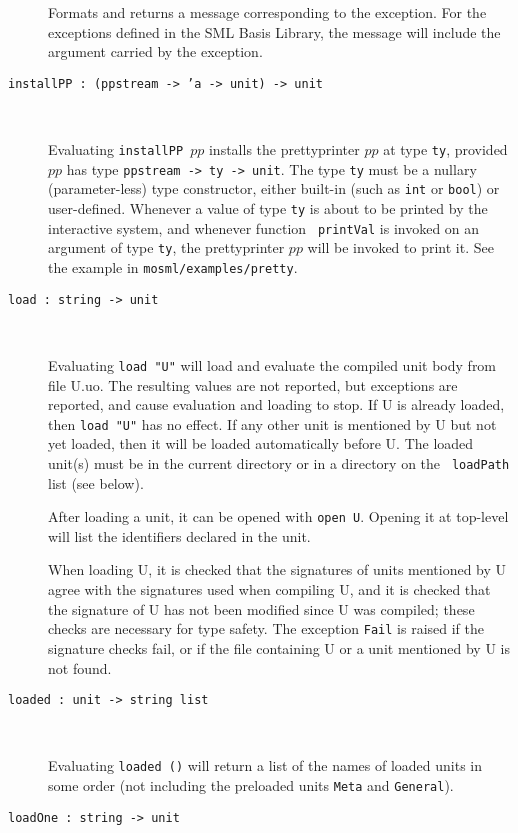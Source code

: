 \documentclass[fleqn]{article}
\begin{document}
\begin{description}
  Formats and returns a message corresponding to the exception.  For
  the exceptions defined in the SML Basis Library, the message will
  include the argument carried by the exception.

\item[{\tt installPP :\ (ppstream -> 'a -> unit) -> unit}]\mbox{ }

  Evaluating {\tt installPP $pp$} installs the prettyprinter $pp$ at
  type {\tt ty}, provided $pp$ has type {\tt ppstream -> ty -> unit}.
  The type {\tt ty} must be a nullary (parameter-less) type
  constructor, either built-in (such as {\tt int} or {\tt bool}) or
  user-defined.  Whenever a value of type {\tt ty} is about to be
  printed by the interactive system, and whenever function {\tt
    printVal} is invoked on an argument of type {\tt ty}, the
  prettyprinter $pp$ will be invoked to print it.  See the example in
  {\tt mosml/examples/pretty}.

\item[{\tt load :\ string -> unit}]\mbox{ }

  Evaluating {\tt load "{\rm U}"} will load and evaluate the compiled
  unit body from file U.uo.  The resulting values are not reported,
  but exceptions are reported, and cause evaluation and loading to
  stop.  If U is already loaded, then {\tt load "{\rm U}"} has no
  effect.  If any other unit is mentioned by U but not yet loaded,
  then it will be loaded automatically before U.  The loaded unit(s)
  must be in the current directory or in a directory on the {\tt
    loadPath} list (see below).

  After loading a unit, it can be opened with {\tt open U}.  Opening
  it at top-level will list the identifiers declared in the unit.

  When loading U, it is checked that the signatures of units mentioned
  by U agree with the signatures used when compiling U, and it is
  checked that the signature of U has not been modified since U was
  compiled; these checks are necessary for type safety.  The exception
  {\tt Fail} is raised if the signature checks fail, or if the file
  containing U or a unit mentioned by U is not found.

\item[{\tt loaded :\ unit -> string list}]\mbox{ }
  
  Evaluating {\tt loaded ()} will return a list of the names of loaded
  units in some order (not including the preloaded units {\tt Meta}
  and {\tt General}).

\item[{\tt loadOne :\ string -> unit}]\mbox{ }


\end{description}
\end{document}
